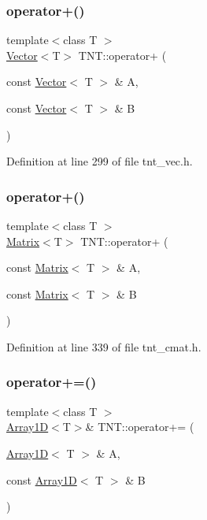 \subsubsection{\texorpdfstring{operator+()}{operator+()}\hspace{0.1cm}{\footnotesize\ttfamily [6/7]}}
{\footnotesize\ttfamily template$<$class T $>$ \\
\hyperlink{classTNT_1_1Vector}{Vector}$<$T$>$ T\+N\+T\+::operator+ (\begin{DoxyParamCaption}\item[{const \hyperlink{classTNT_1_1Vector}{Vector}$<$ T $>$ \&}]{A,  }\item[{const \hyperlink{classTNT_1_1Vector}{Vector}$<$ T $>$ \&}]{B }\end{DoxyParamCaption})}



Definition at line 299 of file tnt\+\_\+vec.\+h.

\mbox{\label{namespaceTNT_aac8c4cff00d07216b49f509ca2ba5833}} 
\subsubsection{\texorpdfstring{operator+()}{operator+()}\hspace{0.1cm}{\footnotesize\ttfamily [7/7]}}
{\footnotesize\ttfamily template$<$class T $>$ \\
\hyperlink{classTNT_1_1Matrix}{Matrix}$<$T$>$ T\+N\+T\+::operator+ (\begin{DoxyParamCaption}\item[{const \hyperlink{classTNT_1_1Matrix}{Matrix}$<$ T $>$ \&}]{A,  }\item[{const \hyperlink{classTNT_1_1Matrix}{Matrix}$<$ T $>$ \&}]{B }\end{DoxyParamCaption})}



Definition at line 339 of file tnt\+\_\+cmat.\+h.

\mbox{\label{namespaceTNT_a7f7491e4135cc219739a541eead94bb5}} 
\subsubsection{\texorpdfstring{operator+=()}{operator+=()}\hspace{0.1cm}{\footnotesize\ttfamily [1/5]}}
{\footnotesize\ttfamily template$<$class T $>$ \\
\hyperlink{classTNT_1_1Array1D}{Array1D}$<$T$>$\& T\+N\+T\+::operator+= (\begin{DoxyParamCaption}\item[{\hyperlink{classTNT_1_1Array1D}{Array1D}$<$ T $>$ \&}]{A,  }\item[{const \hyperlink{classTNT_1_1Array1D}{Array1D}$<$ T $>$ \&}]{B }\end{DoxyParamCaption})}



